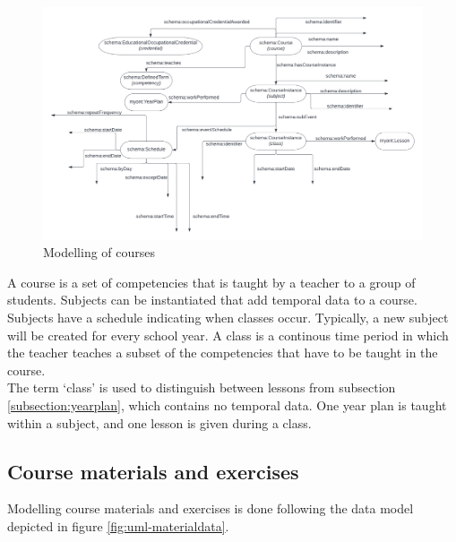 \documentclass[12pt,journal]{IEEEtran}
\begin{document}
\begin{figure}[h]
	\caption{Modelling of courses}
	\label{fig:uml-courses}
	\includegraphics[scale=0.35]{uml-courses.png}
\end{figure}
\noindent A course is a set of competencies that is taught by a teacher to a group of students.
Subjects can be instantiated that add temporal data to a course. Subjects have a schedule indicating when classes occur.
Typically, a new subject will be created for every school year.
A class is a continous time period in which the teacher teaches a subset of the competencies that have to be taught in the course.\\
The term `class' is used to distinguish between lessons from subsection \ref{subsection:yearplan}, which contains no temporal data.
One year plan is taught within a subject, and one lesson is given during a class.

\subsection{Course materials and exercises}

\noindent Modelling course materials and exercises is done following the data model depicted in figure \ref{fig:uml-materialdata}.
\end{document}
